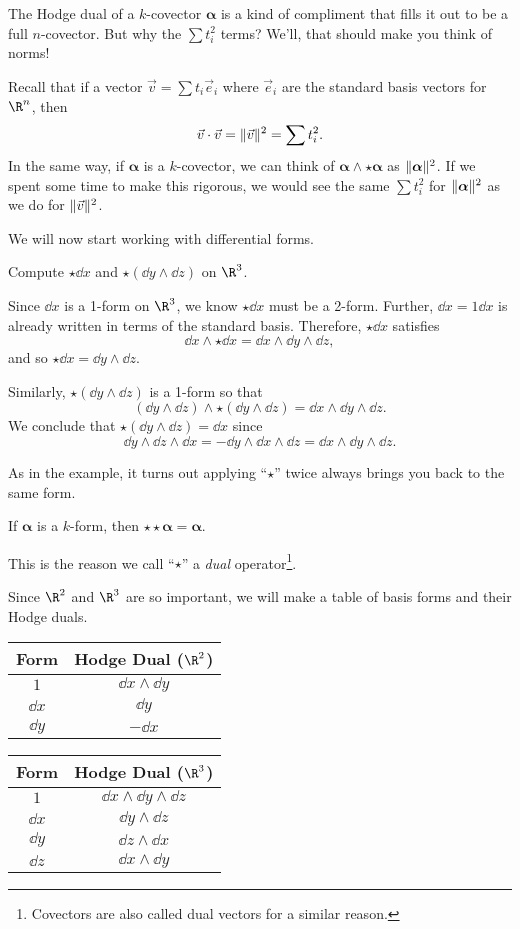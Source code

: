 The Hodge dual of a $k$-covector $\bm\alpha$ is a kind of compliment that fills
it out to be a full $n$-covector.  But why the $\sum t_i^2$ terms?  We'll, that should
make you think of norms!

Recall that if a vector $\vec v = \sum t_i \vec e_i$ where $\vec e_i$ are the standard
basis vectors for $\R^n$, then
\[
	\vec v\cdot \vec v = \lVert\vec v\rVert^2 = \sum t_i^2.
\]
In the same way, if $\bm\alpha$ is a $k$-covector, we can think of $\bm\alpha\wedge \star
\bm\alpha$ as $\lVert\bm\alpha\rVert^2$.  If we spent some time to make this rigorous,
we would see the same $\sum t_i^2$ for $\lVert\bm\alpha\rVert^2$  as we do for $\lVert\vec v\rVert^2$.

We will now start working with differential forms.
\begin{example}
	Compute $\star \dd x$ and $\star (\dd y\wedge \dd z)$ on $\R^3$.

	Since $\dd x$ is a 1-form on $\R^3$, we know $\star \dd x$ must be a
	2-form.  Further, $\dd x=1\dd x$ is already written in terms of the standard
	basis.  Therefore, $\star \dd x$ satisfies
	\[
		\dd x\wedge \star \dd x = \dd x\wedge \dd y\wedge \dd z,
	\]
	and so $\star \dd x = \dd y\wedge \dd z$.

	Similarly, $\star (\dd y\wedge \dd z)$ is a 1-form so that
	\[
		(\dd y\wedge \dd z)\wedge \star (\dd y\wedge \dd z) =\dd x\wedge \dd y\wedge \dd z.
	\]
	We conclude that $\star (\dd y\wedge \dd z) = \dd x$ since
	\[
		\dd y\wedge \dd z\wedge \dd x = -\dd y\wedge \dd x\wedge \dd z = \dd x\wedge \dd y\wedge \dd z.
	\]
\end{example}
As in the example, it turns out applying ``$\star$'' twice always brings you back to the
same form.

\begin{theorem}
	If $\bm\alpha$ is a $k$-form, then $\star \star \bm\alpha = \bm\alpha$.
\end{theorem}
This is the reason we call ``$\star$'' a \emph{dual} operator\footnote{
Covectors are also called dual vectors for a similar reason.
}.

Since $\R^2$ and $\R^3$ are so important, we will make a table of basis forms and
their Hodge duals.
\begin{center}
	\begin{tabular}{c|c}
	Form & Hodge Dual ($\R^2$)\\
	\hline
	$1$ & $\dd x\wedge \dd y$\\
	$\dd x$ & $\dd y$\\
	$\dd y$ & $-\dd x$
	\end{tabular}
\end{center}
\begin{center}
	\begin{tabular}{c|c}
	Form & Hodge Dual ($\R^3$)\\
	\hline
	$1$ & $\dd x\wedge \dd y\wedge \dd z$\\
	$\dd x$ & $\dd y\wedge \dd z$\\
	$\dd y$ & $\dd z\wedge \dd x$\\
	$\dd z$ & $\dd x\wedge \dd y$
	\end{tabular}
\end{center}

